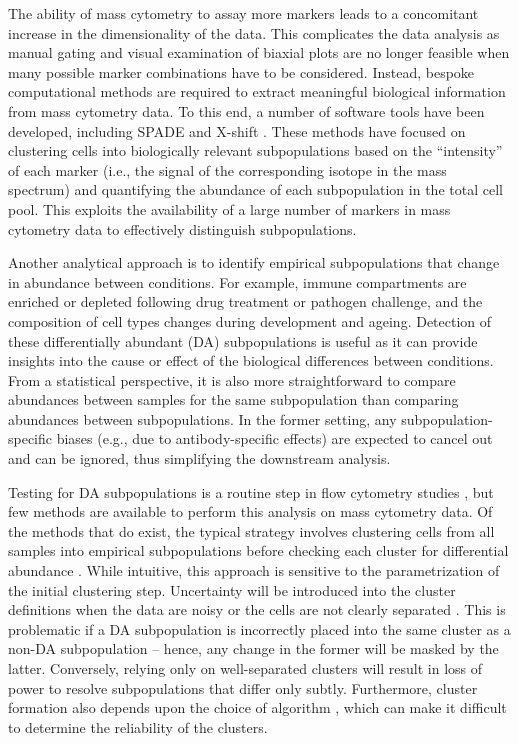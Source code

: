 \documentclass{article}
\begin{document}
The ability of mass cytometry to assay more markers leads to a concomitant increase in the dimensionality of the data.
This complicates the data analysis as manual gating and visual examination of biaxial plots are no longer feasible when many possible marker combinations have to be considered.
Instead, bespoke computational methods are required to extract meaningful biological information from mass cytometry data. 
To this end, a number of software tools have been developed, including SPADE \cite{qiu2011extracting} and X-shift \cite{samusik2016automated}.
These methods have focused on clustering cells into biologically relevant subpopulations based on the ``intensity'' of each marker (i.e., the signal of the corresponding isotope in the mass spectrum) and quantifying the abundance of each subpopulation in the total cell pool.
This exploits the availability of a large number of markers in mass cytometry data to effectively distinguish subpopulations.

Another analytical approach is to identify empirical subpopulations that change in abundance between conditions.
For example, immune compartments are enriched or depleted following drug treatment or pathogen challenge, and the composition of cell types changes during development and ageing.
Detection of these differentially abundant (DA) subpopulations is useful as it can provide insights into the cause or effect of the biological differences between conditions.
From a statistical perspective, it is also more straightforward to compare abundances between samples for the same subpopulation than comparing abundances between subpopulations.
In the former setting, any subpopulation-specific biases (e.g., due to antibody-specific effects) are expected to cancel out and can be ignored, thus simplifying the downstream analysis.

Testing for DA subpopulations is a routine step in flow cytometry studies \cite{saeys2016computational,mittag2011recent}, but few methods are available to perform this analysis on mass cytometry data.
Of the methods that do exist, the typical strategy involves clustering cells from all samples into empirical subpopulations before checking each cluster for differential abundance \cite{anchang2016visualization,bruggner2014automated}.
While intuitive, this approach is sensitive to the parametrization of the initial clustering step.
Uncertainty will be introduced into the cluster definitions when the data are noisy or the cells are not clearly separated \cite{suzuki2006pvclust,kerr2001bootstrapping}.
This is problematic if a DA subpopulation is incorrectly placed into the same cluster as a non-DA subpopulation -- hence, any change in the former will be masked by the latter.
Conversely, relying only on well-separated clusters will result in loss of power to resolve subpopulations that differ only subtly.
Furthermore, cluster formation also depends upon the choice of algorithm \cite{datta2003comparisons,wiwie2015comparing}, which can make it difficult to determine the reliability of the clusters.
\end{document}
